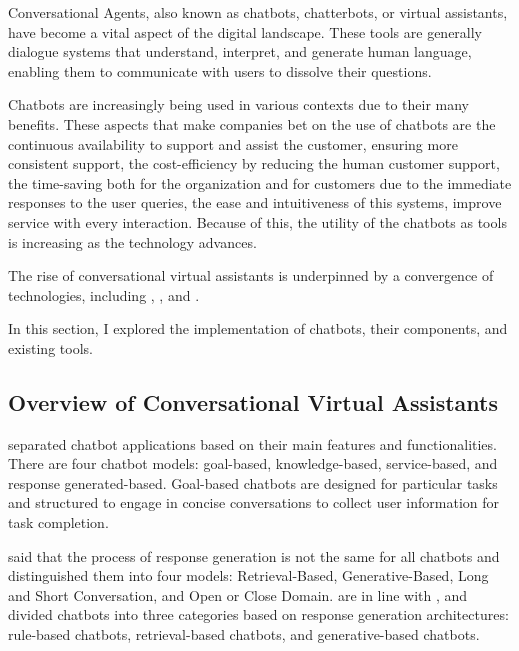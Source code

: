 Conversational Agents, also known as chatbots, chatterbots, or virtual assistants, have become a vital aspect of the digital landscape. These tools are generally dialogue systems that understand, interpret, and generate human language, enabling them to communicate with users to dissolve their questions.

Chatbots are increasingly being used in various contexts due to their many benefits. 
These aspects that make companies bet on the use of chatbots are the continuous availability to support and assist the customer, ensuring more consistent support, the cost-efficiency by reducing the human customer support, the time-saving both for the organization and for customers due to the immediate responses to the user queries, the ease and intuitiveness of this systems, improve service with every interaction. Because of this, the utility of the chatbots as tools is increasing as the technology advances. 

The rise of conversational virtual assistants is underpinned by a convergence of technologies, including {\nlp}, {\mlearning}, and {\ai}.

In this section, I explored the implementation of chatbots, their components, and existing tools.


\subsection{Overview of Conversational Virtual Assistants}

\citet{nuruzzaman_survey_2018} separated chatbot applications based on their main features and functionalities. There are four chatbot models: goal-based, knowledge-based, service-based, and response generated-based. Goal-based chatbots are designed for particular tasks and structured to engage in concise conversations to collect user information for task completion.


\citet{borah_survey_2019} said that the process of response generation is not the same for all chatbots and distinguished them into four models: Retrieval-Based, Generative-Based, Long and Short Conversation, and Open or Close Domain. \citet{chizhik_challenges_2020} are in line with \citet{borah_survey_2019}, and divided chatbots into three categories based on response generation architectures: rule-based chatbots, retrieval-based chatbots, and generative-based chatbots.

